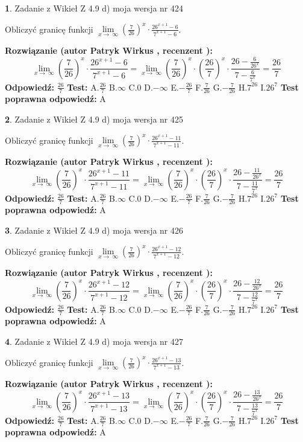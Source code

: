 \documentclass[12pt, a4paper]{article}
\theoremstyle{definition} %
\newtheorem{zad}{}
\newcommand{\zadStart}[1]{\begin{zad}#1\newline}
\newcommand{\zadStop}{\end{zad}}
\newcommand{\rozwStart}[2]{\noindent \textbf{Rozwiązanie (autor #1 , recenzent #2): }\newline}
\newcommand{\rozwStop}{\newline}
\newcommand{\odpStart}{\noindent \textbf{Odpowiedź:}\newline}
\newcommand{\odpStop}{\newline}
\newcommand{\testStart}{\noindent \textbf{Test:}\newline}
\newcommand{\testStop}{\newline}
\newcommand{\kluczStart}{\noindent \textbf{Test poprawna odpowiedź:}\newline}
\newcommand{\kluczStop}{\newline}
\begin{document}
\zadStart{Zadanie z Wikieł Z 4.9 d) moja wersja nr 424}


Obliczyć granicę funkcji  $\lim\limits_{x\to\ \infty}(\frac{7}{26})^{x}\cdot\frac{26^{x+1}-6}{7^{x+1}-6}$.
\zadStop
\rozwStart{Patryk Wirkus}{}
$$\lim\limits_{x\to\ \infty}(\frac{7}{26})^{x}\cdot\frac{26^{x+1}-6}{7^{x+1}-6}=\lim\limits_{x\to\ \infty}(\frac{7}{26})^{x}\cdot(\frac{26}{7})^{x} \cdot \frac{26-\frac{6}{26^{x}}}{7-\frac{6}{7^{x}}} = \frac{26}{7}$$
\rozwStop
\odpStart
$\frac{26}{7}$
\odpStop
\testStart
A.$\frac{26}{7}$ B.$\infty$ C.$0$ D.$-\infty$ E.$-\frac{26}{7}$
F.$\frac{7}{26}$ G.$-\frac{7}{26}$
H.$7^{26}$
I.$26^{7}$
\testStop
\kluczStart
A
\kluczStop



\zadStart{Zadanie z Wikieł Z 4.9 d) moja wersja nr 425}


Obliczyć granicę funkcji  $\lim\limits_{x\to\ \infty}(\frac{7}{26})^{x}\cdot\frac{26^{x+1}-11}{7^{x+1}-11}$.
\zadStop
\rozwStart{Patryk Wirkus}{}
$$\lim\limits_{x\to\ \infty}(\frac{7}{26})^{x}\cdot\frac{26^{x+1}-11}{7^{x+1}-11}=\lim\limits_{x\to\ \infty}(\frac{7}{26})^{x}\cdot(\frac{26}{7})^{x} \cdot \frac{26-\frac{11}{26^{x}}}{7-\frac{11}{7^{x}}} = \frac{26}{7}$$
\rozwStop
\odpStart
$\frac{26}{7}$
\odpStop
\testStart
A.$\frac{26}{7}$ B.$\infty$ C.$0$ D.$-\infty$ E.$-\frac{26}{7}$
F.$\frac{7}{26}$ G.$-\frac{7}{26}$
H.$7^{26}$
I.$26^{7}$
\testStop
\kluczStart
A
\kluczStop



\zadStart{Zadanie z Wikieł Z 4.9 d) moja wersja nr 426}


Obliczyć granicę funkcji  $\lim\limits_{x\to\ \infty}(\frac{7}{26})^{x}\cdot\frac{26^{x+1}-12}{7^{x+1}-12}$.
\zadStop
\rozwStart{Patryk Wirkus}{}
$$\lim\limits_{x\to\ \infty}(\frac{7}{26})^{x}\cdot\frac{26^{x+1}-12}{7^{x+1}-12}=\lim\limits_{x\to\ \infty}(\frac{7}{26})^{x}\cdot(\frac{26}{7})^{x} \cdot \frac{26-\frac{12}{26^{x}}}{7-\frac{12}{7^{x}}} = \frac{26}{7}$$
\rozwStop
\odpStart
$\frac{26}{7}$
\odpStop
\testStart
A.$\frac{26}{7}$ B.$\infty$ C.$0$ D.$-\infty$ E.$-\frac{26}{7}$
F.$\frac{7}{26}$ G.$-\frac{7}{26}$
H.$7^{26}$
I.$26^{7}$
\testStop
\kluczStart
A
\kluczStop



\zadStart{Zadanie z Wikieł Z 4.9 d) moja wersja nr 427}


Obliczyć granicę funkcji  $\lim\limits_{x\to\ \infty}(\frac{7}{26})^{x}\cdot\frac{26^{x+1}-13}{7^{x+1}-13}$.
\zadStop
\rozwStart{Patryk Wirkus}{}
$$\lim\limits_{x\to\ \infty}(\frac{7}{26})^{x}\cdot\frac{26^{x+1}-13}{7^{x+1}-13}=\lim\limits_{x\to\ \infty}(\frac{7}{26})^{x}\cdot(\frac{26}{7})^{x} \cdot \frac{26-\frac{13}{26^{x}}}{7-\frac{13}{7^{x}}} = \frac{26}{7}$$
\rozwStop
\odpStart
$\frac{26}{7}$
\odpStop
\testStart
A.$\frac{26}{7}$ B.$\infty$ C.$0$ D.$-\infty$ E.$-\frac{26}{7}$
F.$\frac{7}{26}$ G.$-\frac{7}{26}$
H.$7^{26}$
I.$26^{7}$
\testStop
\kluczStart
A
\kluczStop
\end{document}
